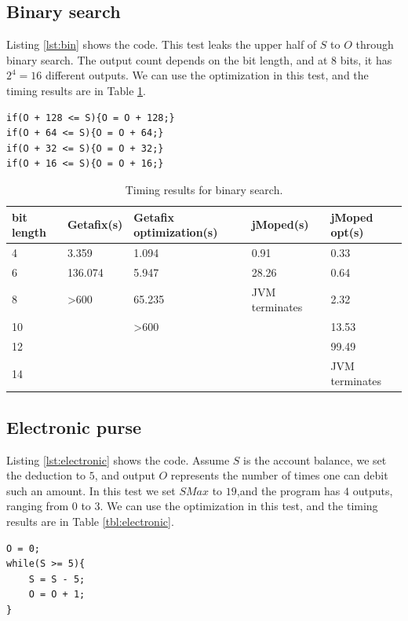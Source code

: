 \subsection{Binary search}
Listing \ref{lst:bin} shows the code. This test leaks the upper half of $S$ to $O$ through binary search. The output count depends on the bit length, and at $8$ bits, it has $2^{4} = 16$ different outputs. We can use the optimization in this test, and the timing results are in Table \ref{tbl:bin}.

\lstset{language=C} 
\begin{lstlisting}[float=!h, caption={Binary search test program at 8 bits.},label=lst:bin]
if(O + 128 <= S){O = O + 128;}
if(O + 64 <= S){O = O + 64;}
if(O + 32 <= S){O = O + 32;}
if(O + 16 <= S){O = O + 16;}
\end{lstlisting}

\begin{table}[!h]
\begin{center}
\begin{tabular}{|l|l|l|l|l|}
\hline
bit length & Getafix(s) & Getafix optimization(s) & jMoped(s) & jMoped opt(s) \\ \hline
4 & 3.359 & 1.094 & 0.91 & 0.33 \\ \hline
6 & 136.074 & 5.947 & 28.26 & 0.64 \\ \hline
8 & \textgreater600 & 65.235 & JVM terminates & 2.32 \\ \hline
10 &  & \textgreater600 &  & 13.53 \\ \hline
12 &  &  &  & 99.49 \\ \hline
14 &  &  &  & JVM terminates \\ \hline
\end{tabular}
\end{center}
\caption{Timing results for binary search.}
\label{tbl:bin}
\end{table}

\subsection{Electronic purse}
Listing \ref{lst:electronic} shows the code. Assume $S$ is the account balance, we set the deduction to $5$, and output $O$ represents the number of times one can debit such an amount.  In this test we set $SMax$ to $19$,and the program has $4$ outputs, ranging from $0$ to $3$. We can use the optimization in this test, and the timing results are in Table \ref{tbl:electronic}.

\lstset{language=C}  
\begin{lstlisting}[float=!h, caption={Electronic purse test program.},label=lst:electronic]
O = 0;
while(S >= 5){
	S = S - 5;
	O = O + 1;
}
\end{lstlisting}

